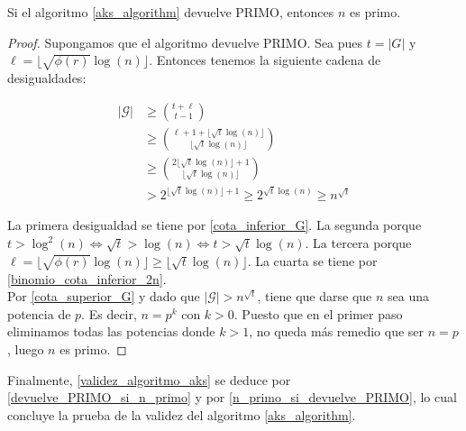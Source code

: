 \begin{lema}\label{n_primo_si_devuelve_PRIMO}
	Si el algoritmo \ref{aks_algorithm} devuelve PRIMO, entonces $n$ es primo. 
\end{lema}

\begin{proof}
	Supongamos que el algoritmo devuelve PRIMO. Sea pues $t = |G|$ y $\ell = \lfloor \sqrt{\phi(r)}\log(n) \rfloor$. Entonces tenemos la siguiente cadena de desigualdades:
	
	\begin{align}
	|\mathcal{G}| &\geq \binom{t + \ell}{t - 1}\\
	&\geq \binom{\ell + 1 + \lfloor \sqrt{t}\log(n) \rfloor}{\lfloor \sqrt{t}\log(n) \rfloor}\\
	&\geq \binom{2\lfloor \sqrt{t}\log(n) \rfloor + 1}{\lfloor \sqrt{t}\log(n) \rfloor}\\
	&> 2^{\lfloor \sqrt{t}\log(n) \rfloor + 1} \geq 2^{\sqrt{t}\log(n)} \geq n^{\sqrt{t}}
	\end{align}
	
	La primera desigualdad se tiene por \autoref{cota_inferior_G}. La segunda porque $t > \log^2(n) \Leftrightarrow \sqrt{t} > \log(n) \Leftrightarrow t > \sqrt{t}\log(n)$. La tercera porque $\ell = \lfloor \sqrt{\phi(r)}\log(n) \rfloor \geq \lfloor \sqrt{t}\log(n) \rfloor$. La cuarta se tiene por \autoref{binomio_cota_inferior_2n}.\\
	
	Por \autoref{cota_superior_G} y dado que $|\mathcal{G}| > n^{\sqrt{t}}$, tiene que darse que $n$ sea una potencia de $p$. Es decir, $n = p^k$ con $k > 0$. Puesto que en el primer paso eliminamos todas las potencias donde $k > 1$, no queda más remedio que ser $n = p$, luego $n$ es primo.
\end{proof}

Finalmente, \autoref{validez_algoritmo_aks} se deduce por \autoref{devuelve_PRIMO_si_n_primo} y por \autoref{n_primo_si_devuelve_PRIMO}, lo cual concluye la prueba de la validez del algoritmo \ref{aks_algorithm}.

\endinput
